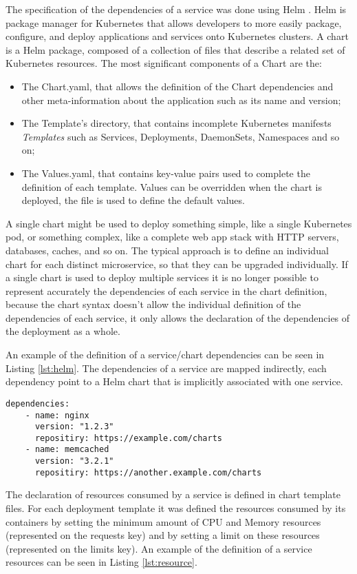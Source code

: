 The specification of the dependencies of a service was done using Helm \cite{helm}.
Helm is package manager for Kubernetes that allows developers to more easily package, configure, and deploy applications and services onto Kubernetes clusters.
A chart is a Helm package, composed of a collection of files that describe a related set of Kubernetes resources.
The most significant components of a Chart are the:
\begin{itemize}
    \item The Chart.yaml, that allows the definition of the Chart dependencies and other meta-information about the application such as its name and version;
    \item The Template's directory, that contains incomplete Kubernetes manifests \textit{Templates} such as Services, Deployments, DaemonSets, Namespaces and so on;
    \item The Values.yaml, that contains key-value pairs used to complete the definition of each template. Values can be overridden when the chart is deployed, the file is used to define the default values.
\end{itemize}
A single chart might be used to deploy something simple, like a single Kubernetes pod, or something complex, like a complete web app stack with HTTP servers, databases, caches, and so on.
The typical approach is to define an individual chart for each distinct microservice, so that they can be upgraded individually.
If a single chart is used to deploy multiple services it is no longer possible to represent accurately the dependencies of each service
in the chart definition, because the chart syntax doesn't allow the individual definition of the dependencies of each service, it only allows the declaration of the dependencies of the deployment as a whole.

An example of the definition of a service/chart dependencies can be seen in Listing \ref{lst:helm}.
The dependencies of a service are mapped indirectly, each dependency point to a Helm chart that is implicitly associated with one service.

\begin{lstlisting}[caption=Chart.yaml example, label=lst:helm, captionpos=b]
dependencies:
    - name: nginx
      version: "1.2.3"
      repositiry: https://example.com/charts
    - name: memcached
      version: "3.2.1"
      repositiry: https://another.example.com/charts
\end{lstlisting}

The declaration of resources consumed by a service is defined in chart template files.
For each deployment template it was defined the resources consumed by its containers by
setting the minimum amount of CPU and Memory resources (represented on the requests key) and by setting a limit on these resources (represented on the limits key).
An example of the definition of a service resources can be seen in Listing \ref{lst:resource}.

